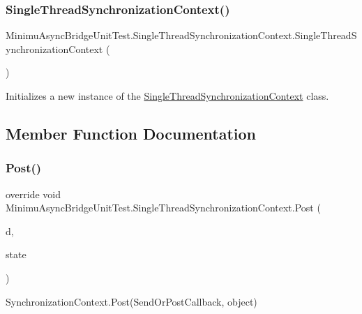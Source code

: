 \subsubsection{\texorpdfstring{Single\+Thread\+Synchronization\+Context()}{SingleThreadSynchronizationContext()}}
{\footnotesize\ttfamily Minimu\+Async\+Bridge\+Unit\+Test.\+Single\+Thread\+Synchronization\+Context.\+Single\+Thread\+Synchronization\+Context (\begin{DoxyParamCaption}{ }\end{DoxyParamCaption})\hspace{0.3cm}{\ttfamily [inline]}}



Initializes a new instance of the \hyperlink{class_minimu_async_bridge_unit_test_1_1_single_thread_synchronization_context}{Single\+Thread\+Synchronization\+Context} class. 



\subsection{Member Function Documentation}
\mbox{\label{class_minimu_async_bridge_unit_test_1_1_single_thread_synchronization_context_a1c03a1c0f78415785d09881bcf103982}} 
\subsubsection{\texorpdfstring{Post()}{Post()}}
{\footnotesize\ttfamily override void Minimu\+Async\+Bridge\+Unit\+Test.\+Single\+Thread\+Synchronization\+Context.\+Post (\begin{DoxyParamCaption}\item[{Send\+Or\+Post\+Callback}]{d,  }\item[{object}]{state }\end{DoxyParamCaption})\hspace{0.3cm}{\ttfamily [inline]}}



Synchronization\+Context.\+Post(\+Send\+Or\+Post\+Callback, object) 


